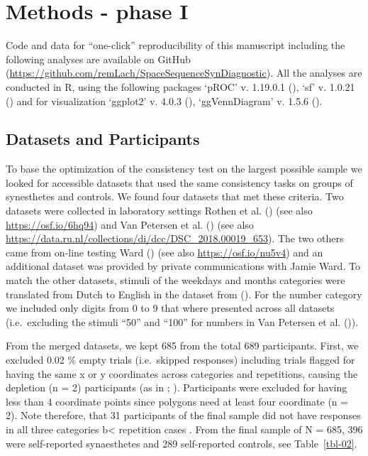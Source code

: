\documentclass[
  man,
  floatsintext,
  longtable,
  a4paper,
  nolmodern,
  notxfonts,
  notimes,
  colorlinks=true,linkcolor=blue,citecolor=blue,urlcolor=blue]{apa7}
\begin{document}
\section{Methods - phase I}\label{methods---phase-i}

Code and data for ``one-click'' reproducibility of this manuscript
including the following analyses are available on GitHub
(\url{https://github.com/remLach/SpaceSequenceSynDiagnostic}). All the
analyses are conducted in R, using the following packages `pROC' v.
1.19.0.1 (), `sf' v. 1.0.21
() and for visualization
`ggplot2' v. 4.0.3 (),
`ggVennDiagram' v. 1.5.6 ().

\subsection{Datasets and Participants}\label{datasets-and-participants}

To base the optimization of the consistency test on the largest possible
sample we looked for accessible datasets that used the same consistency
tasks on groups of synesthetes and controls. We found four datasets that
met these criteria. Two datasets were collected in laboratory settings
Rothen et al. () (see also
\href{https://osf.io/6hq94/files/osfstorage}{https://osf.io/6hq94}) and
Van Petersen et al. () (see also
\url{https://data.ru.nl/collections/di/dcc/DSC_2018.00019_653}). The two
others came from on-line testing Ward ()
(see also \url{https://osf.io/nu5v4}) and an additional dataset was
provided by private communications with Jamie Ward. To match the other
datasets, stimuli of the weekdays and months categories were translated
from Dutch to English in the dataset from
(). For the
number category we included only digits from 0 to 9 that where presented
across all datasets (i.e.~excluding the stimuli ``50'' and ``100'' for
numbers in Van Petersen et al. ()).

From the merged datasets, we kept 685 from the total 689 participants.
First, we excluded 0.02 \% empty trials (i.e.~skipped responses)
including trials flagged for having the same x or y coordinates across
categories and repetitions, causing the depletion (n = 2) participants
(as in ;
). Participants were excluded
for having less than 4 coordinate points since polygons need at least
four coordinate (n = 2). Note therefore, that 31 participants of the
final sample did not have responses in all three categories b\textless{}
repetition cases
.
From the final sample of N = 685, 396 were self-reported synaesthetes
and 289 self-reported controls, see Table~\ref{tbl-02}.
\end{document}

